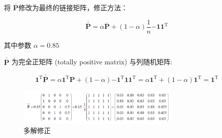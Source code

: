 \documentclass[10t, a4paper, oneside]{ctexbook}
\begin{document}
\noindent 将 $\overline{\mathbf{P}}$修改为最终的链接矩阵，修正方法：

$$\overline{\overline{\mathbf{P}}}=\alpha\overline{\mathbf{P}}+(1-\alpha)\frac{1}{n}{\mathbf{-}}\mathbf{11}^{\mathrm{T}}$$ 

其中参数 $\alpha=0.85$

$\overline{\overline{\mathbf{P}}}$ 为完全正矩阵 (totally positive matrix) 与列随机矩阵:

$$\mathbf{1} ^{\mathrm{T} }\overline{\overline{\mathbf{P}}} = \alpha\mathbf{1} ^{\mathrm{T} }\mathbf{P} + ( 1- \alpha) \mathbf{- } \mathbf{1} ^{\mathrm{T} }\mathbf{1} \mathbf{1} ^{\mathrm{T} }= \alpha\mathbf{1} ^{\mathrm{T} }+ ( 1- \alpha) \mathbf{1} ^{\mathrm{T} }= \mathbf{1} ^{\mathrm{T} }$$

\begin{figure}[H]
    \centering
    \includegraphics[width = 8cm]{assets/多解修正.png}
    \caption{多解修正}
\end{figure}
\end{document}
